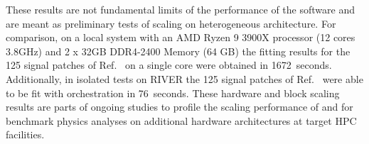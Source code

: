 

These results are not fundamental limits of the performance of the software and are meant as preliminary tests of scaling on heterogeneous architecture.
For comparison, on a local system with an AMD Ryzen 9 3900X processor (12 cores 3.8GHz) and 2 x 32GB DDR4-2400 Memory (64 GB) the fitting results for the 125 signal patches of Ref.~\cite{ATLAS_SUSY_1Lbb_pallet} on a single core were obtained in 1672~seconds.
Additionally, in isolated tests on RIVER the 125 signal patches of Ref.~\cite{ATLAS_SUSY_1Lbb_pallet} were able to be fit with \funcX{} orchestration in 76~seconds.
These hardware and block scaling results are parts of ongoing studies to profile the scaling performance of \funcX{} and \pyhf{} for benchmark physics analyses on additional hardware architectures at target HPC facilities.
